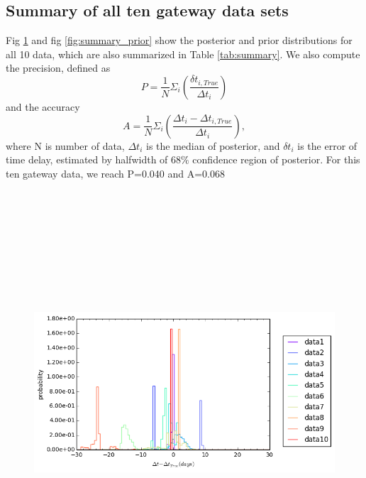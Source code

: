 \documentclass[\docopts]{\docclass}
\begin{document}
\subsection{Summary of all ten gateway data sets}
Fig \ref{fig:summary_post} and fig \ref{fig:summary_prior} show the posterior and prior distributions for all 10 data, which are also summarized in Table \ref{tab:summary}.  We also compute the precision, defined as
\begin{equation}
P=\frac{1}{N} \Sigma_i (\frac{\delta t_{i, True}}{\Delta t_i})
\end{equation}
and the accuracy
\begin{equation}
A = \frac{1}{N} \Sigma_i (\frac{\Delta t_i-\Delta t_{i, True}}{\Delta t_i}),
\end{equation}
where N is number of data, $\Delta t_i$ is the median of posterior, and $\delta t_i$ is the error of time delay, estimated by halfwidth of $68\%$ confidence region of posterior. For this ten gateway data, we reach P=0.040 and A=0.068
\begin{figure}[!h]
\includegraphics[width=\textwidth, height=15cm, keepaspectratio]{summary_posterior_summary.png}
\caption{}
\label{fig:summary_post}
\end{figure}
\end{document}
